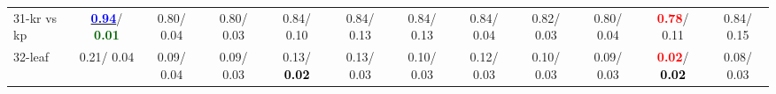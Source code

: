 \begin{table}[h]
\begin{center}
{\begin{tabular}{lc|c|c|c|c|c|c|c|c|c|c}
31-kr vs kp & \underline{\textcolor{blue}{\textbf{  0.94}}}/\textcolor{darkgreen}{\textbf{  0.01}} &   0.80/  0.04 &   0.80/  0.03 &   0.84/  0.10 &   0.84/  0.13 &   0.84/  0.13 &   0.84/  0.04 &   0.82/  0.03 &   0.80/  0.04 & \textcolor{red}{\textbf{  0.78}}/  0.11 &   0.84/  0.15 \\
32-leaf &   0.21/  0.04 &   0.09/  0.04 &   0.09/  0.03 &   0.13/\textcolor{black}{\textbf{  0.02}} &   0.13/  0.03 &   0.10/  0.03 &   0.12/  0.03 &   0.10/  0.03 &   0.09/  0.03 & \textcolor{red}{\textbf{  0.02}}/\textcolor{black}{\textbf{  0.02}} &   0.08/  0.03 \\\end{tabular}}\label{stratsBalAcc0aSVM}
\end{center}
\end{table}
\begin{table}[h]
\caption{acurácia balanceada para SVM: Os maiores valores da média e desvio padrão de cada base está em \textcolor{blue}{\textbf{negrito azul}} e \textcolor{red}{\textbf{negrito vermelho}} respectivamente. Valores isolados estão sublinhados. Os menores valores de desvio padrão estão em \textcolor{darkgreen}{verde}. Apenas negrito indica segundo melhor valor.}
\begin{center}
\end{center}
\end{table}
